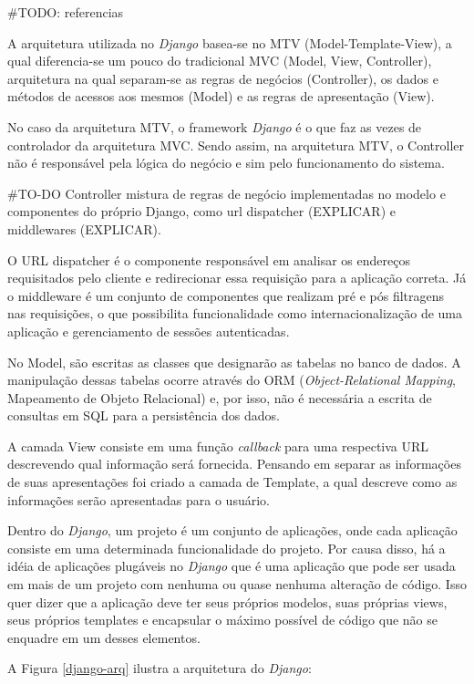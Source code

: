 \#TODO: referencias

A arquitetura utilizada no \textit{Django} basea-se no MTV (Model-Template-View), a qual diferencia-se um pouco do tradicional MVC (Model, View, Controller), arquitetura na qual separam-se as regras de negócios (Controller), os dados e métodos de acessos aos mesmos (Model) e as regras de apresentação (View).

No caso da arquitetura MTV, o framework \textit{Django} é o que faz as vezes de controlador da arquitetura MVC. Sendo assim, na arquitetura MTV, o Controller não é responsável pela lógica do negócio e sim pelo funcionamento do sistema.

\#TO-DO Controller mistura de regras de negócio implementadas no modelo e componentes do próprio Django, como url dispatcher (EXPLICAR) e middlewares (EXPLICAR).

O URL dispatcher é o componente responsável em analisar os endereços requisitados pelo cliente e redirecionar essa requisição para a aplicação correta. Já o middleware é um conjunto de componentes que realizam pré e pós filtragens nas requisições, o que possibilita funcionalidade como internacionalização de uma aplicação e gerenciamento de sessões autenticadas.

No Model, são escritas as classes que designarão as tabelas no banco de dados. A manipulação dessas tabelas ocorre através do ORM (\textit{Object-Relational Mapping}, Mapeamento de Objeto Relacional) e, por isso, não é necessária a escrita de consultas em SQL para a persistência dos dados.

A camada View consiste em uma função \textit{callback} para uma respectiva URL descrevendo qual informação será fornecida. Pensando em separar as informações de suas apresentações foi criado a camada de Template, a qual descreve como as informações serão apresentadas para o usuário.

Dentro do \textit{Django}, um projeto é um conjunto de aplicações, onde cada aplicação consiste em uma determinada funcionalidade do projeto. Por causa disso, há a idéia de aplicações plugáveis no \textit{Django} que é uma aplicação que pode ser usada em mais de um projeto com nenhuma ou quase nenhuma alteração de código. Isso quer dizer que a aplicação deve ter seus próprios modelos, suas próprias views, seus próprios templates e encapsular o máximo possível de código que não se enquadre em um desses elementos.

A Figura \ref{django-arq} ilustra a arquitetura do \textit{Django}:


